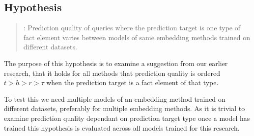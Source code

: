 \addtocounter{hcounter}{1}
\subsection{Hypothesis \thehcounter} %
\label{sec:hypothesis_\thehcounter}

\begin{quote}
: 
Prediction quality of queries where the prediction target is one type of fact element varies between models of same embedding methods trained on different datasets.
\end{quote}

The purpose of this hypothesis is to examine a suggestion from our earlier research, that it holds for all methods that prediction quality is ordered $t>h>r>\tau$ when the prediction target is a fact element of that type.

To test this we need multiple models of an embedding method trained on different datasets, preferably for multiple embedding methods.
As it is trivial to examine prediction quality dependant on prediction target type once a model has trained this hypothesis is evaluated across all models trained for this research.